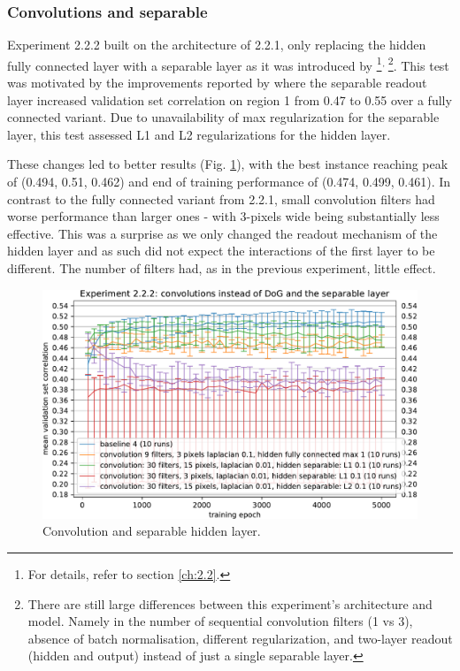 \subsubsection{Convolutions and separable}

Experiment 2.2.2 built on the architecture of 2.2.1, only replacing the hidden fully connected layer with a separable layer as it was introduced by \cite{klindt}\footnote{For details, refer to section \ref{ch:2.2}.}$^{,\thinspace}$\footnote{There are still large differences between this experiment’s architecture and \cite{klindt} model. Namely in the number of sequential convolution filters (1 vs 3), absence of batch normalisation, different regularization, and two-layer readout (hidden and output) instead of just a single separable layer.}. This test was motivated by the improvements reported by \citeauthor{klindt} where the separable readout layer increased validation set correlation on region 1 from 0.47 to 0.55 over a fully connected variant. Due to unavailability of max regularization for the separable layer, this test assessed L1 and L2 regularizations for the hidden layer.

These changes led to better results (Fig. \ref{fig:5.2.2.2}), with the best instance reaching peak of (0.494, 0.51, 0.462) and end of training performance of (0.474, 0.499, 0.461). In contrast to the fully connected variant from 2.2.1, small convolution filters had worse performance than larger ones - with 3-pixels wide being substantially less effective. This was a surprise as we only changed the readout mechanism of the hidden layer and as such did not expect the interactions of the first layer to be different. The number of filters had, as in the previous experiment, little effect.

\begin{figure}[H]
    \centering
    \includegraphics[width=1\textwidth]{../figures/05_2_2_2}
    \caption[Experiment 2.2.2]{Convolution and separable hidden layer.}
    \label{fig:5.2.2.2}
\end{figure}

